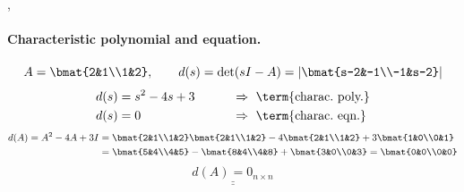 \sep
\paragraph{Characteristic polynomial and equation.}
\[
A=\bmat{2&1\\1&2},\qquad
d(s)=\det(sI-A)=\left|\bmat{s-2&-1\\-1&s-2}\right|
\]
\begin{alignat*}{2}
d(s)&=s^2-4s+3 &\qquad&\Rightarrow\ \text{\term{charac.\ poly.}}\\
d(s)&=0 &&\Rightarrow\ \text{\term{charac.\ eqn.}}
\end{alignat*}
\begin{align*}
d(A)=A^2-4A+3I &= \bmat{2&1\\1&2}\bmat{2&1\\1&2}-4\bmat{2&1\\1&2}+3\bmat{1&0\\0&1}\\
&= \bmat{5&4\\4&5}-\bmat{8&4\\4&8}+\bmat{3&0\\0&3}=\bmat{0&0\\0&0}
\end{align*}
\[
\underline{\underline{d(A)=0_{n\times n}}}
\]

